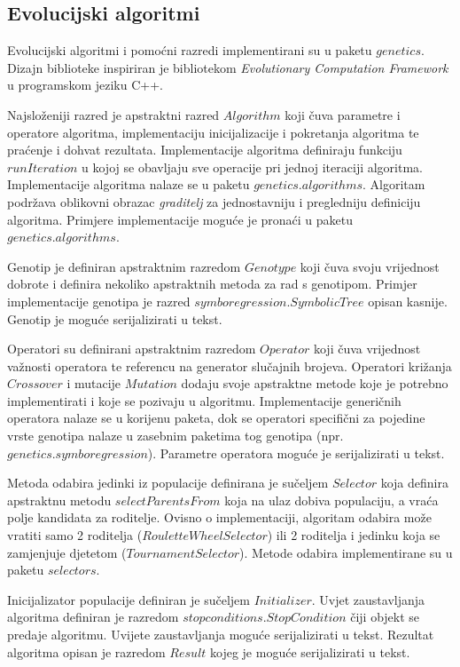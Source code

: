 \documentclass[times, utf8, numeric, diplomski]{fer}
\begin{document}
\subsection{Evolucijski algoritmi}
Evolucijski algoritmi i pomoćni razredi implementirani su u paketu $genetics$. Dizajn biblioteke inspiriran je bibliotekom \textit{Evolutionary Computation Framework} \citep{ecf} u programskom jeziku C++. 

Najsloženiji razred je apstraktni razred $Algorithm$ koji čuva parametre i operatore algoritma, implementaciju inicijalizacije i pokretanja algoritma te praćenje i dohvat rezultata. Implementacije algoritma definiraju funkciju $runIteration$ u kojoj se obavljaju sve operacije pri jednoj iteraciji algoritma. Implementacije algoritma nalaze se u paketu $genetics.algorithms$. Algoritam podržava oblikovni obrazac \textit{graditelj} za jednostavniju i pregledniju definiciju algoritma. Primjere implementacije moguće je pronaći u paketu $genetics.algorithms$.

Genotip je definiran apstraktnim razredom $Genotype$ koji čuva svoju vrijednost dobrote i definira nekoliko apstraktnih metoda za rad s genotipom. Primjer implementacije genotipa je razred $symboregression.SymbolicTree$ opisan kasnije. Genotip je moguće serijalizirati u tekst.

Operatori su definirani apstraktnim razredom $Operator$ koji čuva vrijednost važnosti operatora te referencu na generator slučajnih brojeva. Operatori križanja $Crossover$ i mutacije $Mutation$ dodaju svoje apstraktne metode koje je potrebno implementirati i koje se pozivaju u algoritmu. Implementacije generičnih operatora nalaze se u korijenu paketa, dok se operatori specifični za pojedine vrste genotipa nalaze u zasebnim paketima tog genotipa (npr. $genetics.symboregression$). Parametre operatora moguće je serijalizirati u tekst.

Metoda odabira jedinki iz populacije definirana je sučeljem $Selector$ koja definira apstraktnu metodu $selectParentsFrom$ koja na ulaz dobiva populaciju, a vraća polje kandidata za roditelje. Ovisno o implementaciji, algoritam odabira može vratiti samo 2 roditelja ($RouletteWheelSelector$) ili 2 roditelja i jedinku koja se zamjenjuje djetetom ($TournamentSelector$). Metode odabira implementirane su u paketu $selectors$.

Inicijalizator populacije definiran je sučeljem $Initializer$. Uvjet zaustavljanja algoritma definiran je razredom $stopconditions.StopCondition$ čiji objekt se predaje algoritmu. Uvijete zaustavljanja moguće serijalizirati u tekst. Rezultat algoritma opisan je razredom $Result$ kojeg je moguće serijalizirati u tekst.
\end{document}
